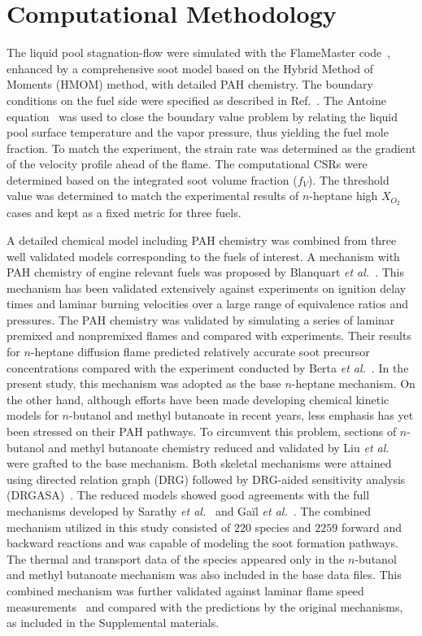 \documentclass[review,3p,times]{elsarticleUS}
\begin{document}
\section{Computational Methodology}

The liquid pool stagnation-flow were simulated with the FlameMaster code~\cite{flamemaster}, enhanced by a comprehensive soot model based on the Hybrid Method of Moments (HMOM) method, with detailed PAH chemistry. The boundary conditions on the fuel side were specified as described in Ref.~\cite{buipham91}. The Antoine equation~\cite{polingbook} was used to close the boundary value problem by relating the liquid pool surface temperature and the vapor pressure, thus yielding the fuel mole fraction. To match the experiment, the strain rate was determined as the gradient of the velocity profile ahead of the flame. The computational CSRs were determined based on the integrated soot volume fraction ($f_V$). The threshold value was determined to match the experimental results of $n$-heptane high $X_{O_2}$ cases and kept as a fixed metric for three fuels.

A detailed chemical model including PAH chemistry was combined from three well validated models corresponding to the fuels of interest. A mechanism with PAH chemistry of engine relevant fuels was proposed by Blanquart \emph{et al.}~\cite{blanquart09b}. This mechanism has been validated extensively against experiments on ignition delay times and laminar burning velocities over a large range of equivalence ratios and pressures. The PAH chemistry was validated by simulating a series of laminar premixed and nonpremixed flames and compared with experiments. Their results for $n$-heptane diffusion flame predicted relatively accurate soot precursor concentrations compared with the experiment conducted by Berta \emph{et al.}~\cite{berta06}. In the present study, this mechanism was adopted as the base $n$-heptane mechanism. On the other hand, although efforts have been made developing chemical kinetic models for $n$-butanol and methyl butanoate in recent years, less emphasis has yet been stressed on their PAH pathways. To circumvent this problem, sections of $n$-butanol and methyl butanoate chemistry reduced and validated by Liu \emph{et al.}~\cite{liu11} were grafted to the base mechanism. Both skeletal mechanisms were attained using directed relation graph (DRG) followed by DRG-aided sensitivity analysis (DRGASA)~\cite{lu06a,lu06b,zheng07}. The reduced models showed good agreements with the full mechanisms developed by Sarathy \emph{et al.}~\cite{sarathy09} and Ga\"il \emph{et al.}~\cite{gail08}. The combined mechanism utilized in this study consisted of $220$ species and $2259$ forward and backward reactions and was capable of modeling the soot formation pathways. The thermal and transport data of the species appeared only in the $n$-butanol and methyl butanoate mechanism was also included in the base data files. This combined mechanism was further validated against laminar flame speed measurements~\cite{liu11} and compared with the predictions by the original mechanisms, as included in the Supplemental materials.
\end{document}
